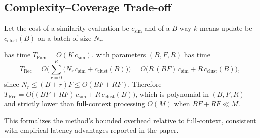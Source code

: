 \subsection{Complexity–Coverage Trade-off}
Let the cost of a similarity evaluation be $c_{\text{sim}}$ and of a $B$-way $k$-means update be $c_{\text{clust}}(B)$ on a batch of size $N_r$.

\begin{proposition}
\label{prop:complexity}
 has time $T_{\text{Fam}}=O(K\,c_{\text{sim}})$.
 with parameters $(B,F,R)$ has time
\begin{equation}
T_{\text{Rec}}=O\Big(\sum_{r=0}^{R} \big(N_r\,c_{\text{sim}}+c_{\text{clust}}(B)\big)\Big)
=O\big(R\,(BF)\,c_{\text{sim}}+R\,c_{\text{clust}}(B)\big),
\end{equation}
since $N_r\le (B+r)F\le O(BF+RF)$.
Therefore $T_{\text{Rec}}=O\big((BF+RF)\,c_{\text{sim}}+R\,c_{\text{clust}}(B)\big)$, which is polynomial in $(B,F,R)$ and strictly lower than full-context processing $O(M)$ when $BF+RF\ll M$.
\end{proposition}

\noindent This formalizes the method’s bounded overhead relative to full-context, consistent with empirical latency advantages reported in the paper.




